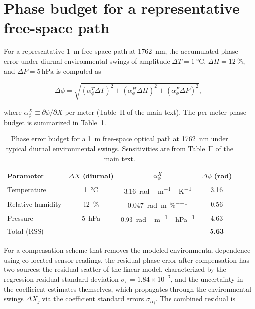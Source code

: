 \documentclass[aps,prapplied,reprint,superscriptaddress]{revtex4-2}
\begin{document}
\section{Phase budget for a representative free-space path}
\label{sec:S3}

For a representative \SI{1}{\meter} free-space path at \SI{1762}{\nano\meter}, the accumulated phase error under diurnal environmental swings of amplitude $\Delta T = \SI{1}{\degreeCelsius}$, $\Delta H = \SI{12}{\percent}$, and $\Delta P = \SI{5}{\hecto\pascal}$ is computed as

\begin{equation}
\Delta\phi = \sqrt{(\alpha_\phi^T\Delta T)^2 + (\alpha_\phi^H\Delta H)^2 + (\alpha_\phi^P\Delta P)^2},
\end{equation}

where $\alpha_\phi^X \equiv \partial\phi/\partial X$ per meter (Table~II of the main text). The per-meter phase budget is summarized 
in Table~\ref{tab:S3}.

\begin{table}[tbp]
\centering
\caption{Phase error budget for a \SI{1}{\meter} free-space optical path at \SI{1762}{\nano\meter} under typical diurnal environmental swings. Sensitivities are from Table~II of the main text.}
\label{tab:S3}
\begin{tabular}{lccc}
\hline
Parameter  & $\Delta X$ (diurnal)  & $\alpha_\phi^X$  & $\Delta\phi$ (\si{\radian}) \\
\hline
Temperature & \SI{1}{\degreeCelsius}  & \SI{3.16}{\radian\,m^{-1}\,K^{-1}}  & \num{3.16}  \\
Relative humidity  & \SI{12}{\percent}  & \SI{0.047}{\radian\per\meter\per\percent}  & \num{0.56}  \\
Pressure   & \SI{5}{\hecto\pascal}  & \SI{0.93}{\radian\,m^{-1}\,hPa^{-1}}  & \num{4.63}  \\
\hline
Total (RSS) &  &  & \textbf{\num{5.63}} \\
\hline
\end{tabular}
\end{table}

For a compensation scheme that removes the modeled environmental dependence using co-located sensor readings, the residual phase error after compensation has two sources: the residual scatter of the linear model, characterized by the regression residual standard deviation $\sigma_n = 1.84 \times 10^{-7}$, and the uncertainty in the coefficient estimates themselves, which propagates through the environmental swings $\Delta X_j$ via the coefficient standard errors $\sigma_{\alpha_j}$. The combined residual is
\end{document}
